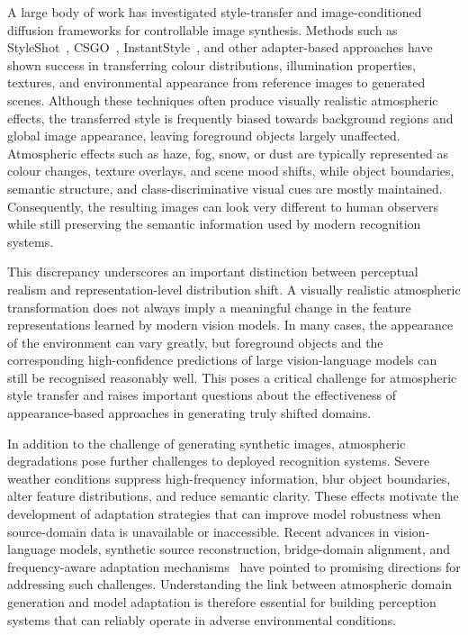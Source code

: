 \noindent A large body of work has investigated style-transfer and image-conditioned diffusion frameworks for controllable image synthesis. Methods such as StyleShot~\cite{styleshot2024}, CSGO~\cite{csgo2024}, InstantStyle~\cite{wang2024instantstyle}, and other adapter-based approaches have shown success in transferring colour distributions, illumination properties, textures, and environmental appearance from reference images to generated scenes. Although these techniques often produce visually realistic atmospheric effects, the transferred style is frequently biased towards background regions and global image appearance, leaving foreground objects largely unaffected. Atmospheric effects such as haze, fog, snow, or dust are typically represented as colour changes, texture overlays, and scene mood shifts, while object boundaries, semantic structure, and class-discriminative visual cues are mostly maintained. Consequently, the resulting images can look very different to human observers while still preserving the semantic information used by modern recognition systems.

\noindent This discrepancy underscores an important distinction between perceptual realism and representation-level distribution shift. A visually realistic atmospheric transformation does not always imply a meaningful change in the feature representations learned by modern vision models. In many cases, the appearance of the environment can vary greatly, but foreground objects and the corresponding high-confidence predictions of large vision-language models  can still be recognised reasonably well. This poses a critical challenge for atmospheric style transfer and raises important questions about the effectiveness of appearance-based approaches in generating truly shifted domains.

\noindent In addition to the challenge of generating synthetic images, atmospheric degradations pose further challenges to deployed recognition systems. Severe weather conditions suppress high-frequency information, blur object boundaries, alter feature distributions, and reduce semantic clarity. These effects motivate the development of adaptation strategies that can improve model robustness when source-domain data is unavailable or inaccessible. Recent advances in vision-language models, synthetic source reconstruction, bridge-domain alignment, and frequency-aware adaptation mechanisms~\cite{guibas2021afno} have pointed to promising directions for addressing such challenges. Understanding the link between atmospheric domain generation and model adaptation is therefore essential for building perception systems that can reliably operate in adverse environmental conditions.

